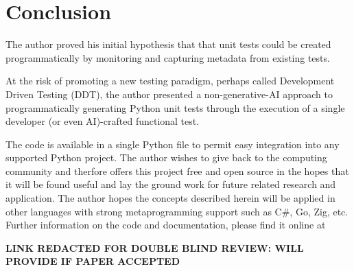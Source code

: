 \section{Conclusion}\label{sec:conclusion}

The author proved his initial hypothesis that 
that unit tests could be
created programmatically by monitoring and capturing 
metadata from existing tests.

At the risk of promoting a new testing paradigm, perhaps 
called Development Driven Testing (DDT), the author 
presented a non-generative-AI approach to 
programmatically generating Python unit tests through
the execution of a single developer (or even AI)-crafted
functional test.

The code is available in a single Python file to permit 
easy integration into any supported Python project.
The author wishes to give back to the computing community
and therfore offers this project free and open source
in the hopes that it will be found useful and lay the ground
work for future related research and application.
The author hopes the concepts described herein will be 
applied in other languages with strong metaprogramming support
such as C\#, Go, Zig, etc. Further information on the code and  documentation, please
find it online at
%
\begin{center}
  \textbf{LINK REDACTED FOR DOUBLE BLIND REVIEW: WILL PROVIDE IF PAPER ACCEPTED}
\end{center}


